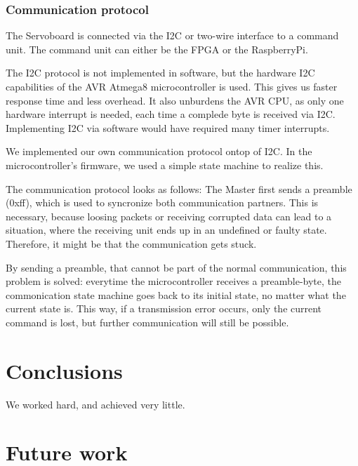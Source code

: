 \documentclass[12pt]{article}
\begin{document}
\subsubsection{Communication protocol}
The Servoboard is connected via the I2C or two-wire interface to a command unit.
The command unit can either be the FPGA or the RaspberryPi.


The I2C protocol is not implemented in software, but the hardware I2C capabilities of the AVR Atmega8 microcontroller is used.
This gives us faster response time and less overhead.
It also unburdens the AVR CPU, as only one hardware interrupt is needed, each time a complede byte is received via I2C.
Implementing I2C via software would have required many timer interrupts.


We implemented our own communication protocol ontop of I2C.
In the microcontroller's firmware, we used a simple state machine to realize this.

The communication protocol looks as follows:
The Master first sends a preamble (0xff), which is used to syncronize both communication partners.
This is necessary, because loosing packets or receiving corrupted data can lead to a situation, where the receiving unit ends up in an undefined or faulty state.
Therefore, it might be that the communication gets stuck.

By sending a preamble, that cannot be part of the normal communication, this problem is solved: everytime the microcontroller receives a preamble-byte, the commonication state machine goes back to its initial state, no matter what the current state is.
This way, if a transmission error occurs, only the current command is lost, but further communication will still be possible.

\section{Conclusions}\label{conclusions}
We worked hard, and achieved very little.

\section{Future work}



\end{document}
